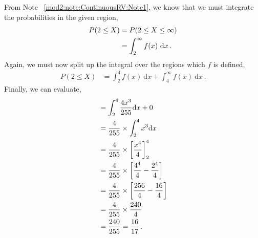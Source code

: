 \begin{subquestions}
\begin{subsubquestions}
	
\subsubquestion

From Note ~\ref{mod2:note:ContinuousRV:Note1}, we know that we must integrate the probabilities in the given region,
\begin{align}
	P(2 \leq X) &= P(2\leq X \leq \infty) \nonumber \\
	           & = \int_2^{\infty} f(x)~\mathrm{d}x \,.
\end{align}
Again, we must now split up the integral over the regions which $f$ is defined,
\begin{align}
	P(2 \leq X)  & = \int_2^{4} f(x)~\mathrm{d}x+\int_4^{\infty} f(x)~\mathrm{d}x \,.
\end{align}
Finally, we can evaluate,
\begin{align}
                                    & = \int_{2}^{4} \frac{4x^3}{255} \mathrm{d}x + 0 \nonumber \\
	                                 & = \frac{4}{255} \times \int_2^4 x^3\mathrm{d}x \nonumber \\
	                                 & = \frac{4}{255} \times \left[\frac{x^4}{4}\right]^4_2 \nonumber \\
	                                 & = \frac{4}{255} \times \left[\frac{4^4}{4}-\frac{2^4}{4}\right] \nonumber \\
	                                 & = \frac{4}{255} \times \left[\frac{256}{4}-\frac{16}{4}\right] \nonumber \\
	                                 & = \frac{4}{255} \times \frac{240}{4} \nonumber \\
	                                 & = \frac{240}{255} = \frac{16}{17} \,.
\end{align}
	

\subsubquestion


\end{subsubquestions}
\end{subquestions}
